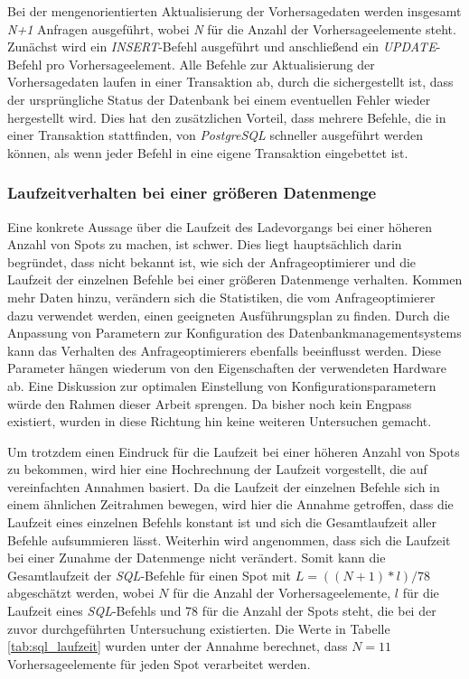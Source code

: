 Bei der mengenorientierten Aktualisierung der Vorhersagedaten werden
insgesamt \textit{N+1} Anfragen ausgeführt, wobei \textit{N} für die
Anzahl der Vorhersageelemente steht. Zunächst wird ein
\textit{INSERT}-Befehl ausgeführt und anschließend ein
\textit{UPDATE}-Befehl pro Vorhersageelement. Alle Befehle zur
Aktualisierung der Vorhersagedaten laufen in einer Transaktion ab,
durch die sichergestellt ist, dass der ursprüngliche Status der
Datenbank bei einem eventuellen Fehler wieder hergestellt wird. Dies
hat den zusätzlichen Vorteil, dass mehrere Befehle, die in einer
Transaktion stattfinden, von \textit{PostgreSQL} schneller ausgeführt
werden können, als wenn jeder Befehl in eine eigene Transaktion
eingebettet ist. 


\subsubsection{Laufzeitverhalten bei einer größeren Datenmenge}
Eine konkrete Aussage über die Laufzeit des Ladevorgangs bei einer
höheren Anzahl von Spots zu machen, ist schwer. Dies liegt
hauptsächlich darin begründet, dass nicht bekannt ist, wie sich der
Anfrageoptimierer und die Laufzeit der einzelnen Befehle bei einer
größeren Datenmenge verhalten. Kommen mehr Daten hinzu, verändern sich
die Statistiken, die vom Anfrageoptimierer dazu verwendet werden,
einen geeigneten Ausführungsplan zu finden. Durch die Anpassung von
Parametern zur Konfiguration des Datenbankmanagementsystems kann das
Verhalten des Anfrageoptimierers ebenfalls beeinflusst werden. Diese
Parameter hängen wiederum von den Eigenschaften der verwendeten
Hardware ab. Eine Diskussion zur optimalen Einstellung von
Konfigurationsparametern würde den Rahmen dieser Arbeit sprengen. Da
bisher noch kein Engpass existiert, wurden in diese Richtung hin keine
weiteren Untersuchen gemacht.

Um trotzdem einen Eindruck für die Laufzeit bei einer höheren Anzahl
von Spots zu bekommen, wird hier eine Hochrechnung der Laufzeit
vorgestellt, die auf vereinfachten Annahmen basiert. Da die Laufzeit
der einzelnen Befehle sich in einem ähnlichen Zeitrahmen bewegen, wird
hier die Annahme getroffen, dass die Laufzeit eines einzelnen Befehls
konstant ist und sich die Gesamtlaufzeit aller Befehle aufsummieren
lässt. Weiterhin wird angenommen, dass sich die Laufzeit bei einer
Zunahme der Datenmenge nicht verändert. Somit kann die Gesamtlaufzeit
der \textit{SQL}-Befehle für einen Spot mit $L = ((N+1) * l) / 78$
abgeschätzt werden, wobei $N$ für die Anzahl der Vorhersageelemente,
$l$ für die Laufzeit eines \textit{SQL}-Befehls und 78 für die Anzahl
der Spots steht, die bei der zuvor durchgeführten Untersuchung
existierten. Die Werte in Tabelle \ref{tab:sql_laufzeit} wurden unter
der Annahme berechnet, dass $N=11$ Vorhersageelemente für jeden Spot
verarbeitet werden.

